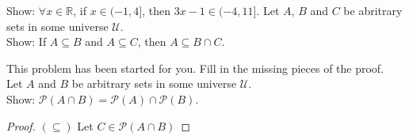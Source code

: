 \documentclass[10pt]{exam}
\begin{document}


\clearpage



\begin{questions}

\question 
{}
 
\question Show: $\forall x\in \mathbb{R}$, if $x\in (-1,4]$, then $3x-1\in (-4,11]$.
\vspace{10pc}
\question Let $A$, $B$ and $C$ be abritrary sets in some universe $\mathcal{U}$.  \\

Show: If $A\subseteq B$ and $A\subseteq C$, then $A \subseteq B\cap C$.
\vspace{10pc}

\newpage
\question This problem has been started for you.  Fill in the missing pieces of the proof.\\

Let $A$ and $B$ be arbitrary sets in some universe $\mathcal{U}$.\\
Show: $\mathcal{P}(A\cap B)=\mathcal{P}(A)\cap\mathcal{P}(B)$.
\begin{proof} \smallskip
$(\subseteq)$ Let $C\in \mathcal{P}(A\cap B)$


\end{proof}
\end{questions}
\end{document}
